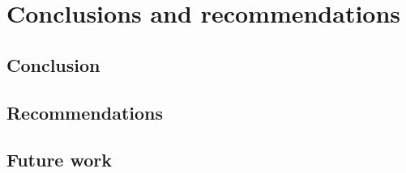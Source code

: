 \chapter{Conclusions and recommendations}
\label{cha:conclusions}
\section{Conclusion}


\section{Recommendations}

\section{Future work}
